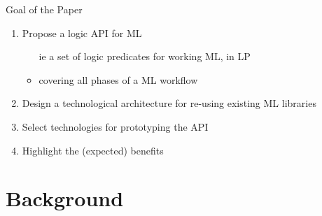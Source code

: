 \documentclass[presentation]{beamer}\mode<presentation>{\usetheme{AMSBolognaFC}}
\begin{document}
\begin{frame}{Goal of the Paper}

    \begin{enumerate}
        \item Propose a logic API for ML
        \begin{itemize}
            \item[ie] a set of logic predicates for working ML, in LP
            \item covering all phases of a ML workflow
        \end{itemize}
        
        \vfill

        \item Design a technological architecture for re-using existing ML libraries
        
        \vfill

        \item Select technologies for prototyping the API
        
        \vfill

        \item Highlight the (expected) benefits
    \end{enumerate}

\end{frame}

\section{Background}
\end{document}
